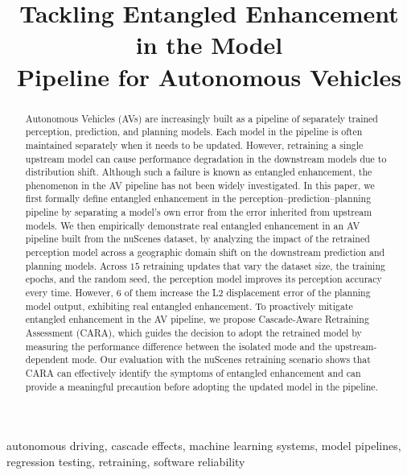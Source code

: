 \documentclass[conference]{IEEEtran}
\title{Tackling Entangled Enhancement in the Model\\
Pipeline for Autonomous Vehicles}
\author{\IEEEauthorblockN{Rashedul Arefin Ifty, Fumio Machida}
\IEEEauthorblockA{University of Tsukuba\\
Tsukuba, Japan\\
ifty.rashedul@sd.cs.tsukuba.ac.jp, machida@cs.tsukuba.ac.jp}}
\begin{document}
\maketitle
\thispagestyle{empty}

\begin{abstract}
Autonomous Vehicles (AVs) are increasingly built as a pipeline of separately trained
perception, prediction, and planning models. Each model in the pipeline is often maintained separately when it needs to be updated. However, retraining a single upstream model
can cause performance degradation in the downstream models due to distribution shift. Although such a failure is known as entangled enhancement, the phenomenon in the AV pipeline has not been widely investigated. In this paper, we first formally define entangled enhancement in the perception--prediction--planning pipeline by separating a model's own error from the error inherited from upstream models. We then empirically demonstrate real entangled enhancement in an AV pipeline built from the nuScenes dataset, by analyzing the impact of the retrained perception model across a geographic domain shift on the downstream prediction and planning models. Across $15$
retraining updates that vary the dataset size, the training epochs, and the random seed, the perception model improves its perception accuracy every time. However, $6$ of them increase the L2 displacement error of the planning model output, exhibiting real entangled enhancement. To proactively mitigate entangled enhancement in the AV pipeline, we propose Cascade-Aware Retraining Assessment
(CARA), which guides the decision to adopt the retrained model by measuring the performance difference between the isolated mode and the upstream-dependent mode. Our evaluation with the nuScenes retraining scenario shows that CARA can effectively identify the symptoms of entangled enhancement and can provide a meaningful precaution before adopting the updated model in the pipeline.
\end{abstract}

\begin{IEEEkeywords}
autonomous driving, cascade effects, machine learning systems, model pipelines,
regression testing, retraining, software reliability
\end{IEEEkeywords}

\end{document}
